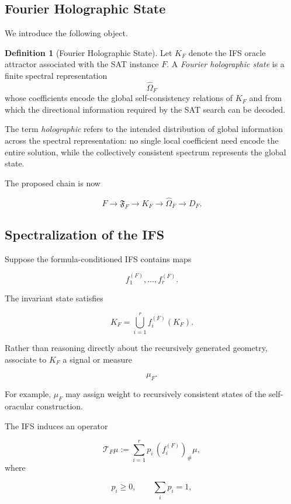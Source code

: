 \documentclass[11pt]{article}
\theoremstyle{plain}
\theoremstyle{definition}
\newtheorem{definition}[theorem]{Definition}
\begin{document}
\subsection{Fourier Holographic State}

We introduce the following object.

\begin{definition}[Fourier Holographic State]
\label{def:fourier-holographic-state}
Let \(K_F\) denote the IFS oracle attractor associated with the SAT instance
\(F\).  A \emph{Fourier holographic state} is a finite spectral
representation
\[
    \widehat{\Omega}_F
\]
whose coefficients encode the global self-consistency relations of \(K_F\)
and from which the directional information required by the SAT search can be
decoded.
\end{definition}

The term \emph{holographic} refers to the intended distribution of global
information across the spectral representation: no single local coefficient
need encode the entire solution, while the collectively consistent spectrum
represents the global state.

The proposed chain is now

\[
\boxed{
F
\longrightarrow
\mathfrak{F}_F
\longrightarrow
K_F
\longrightarrow
\widehat{\Omega}_F
\longrightarrow
D_F.
}
\]

\subsection{Spectralization of the IFS}

Suppose the formula-conditioned IFS contains maps

\[
    f_1^{(F)},\dots,f_r^{(F)}.
\]

The invariant state satisfies

\[
    K_F
    =
    \bigcup_{i=1}^{r}
    f_i^{(F)}(K_F).
\]

Rather than reasoning directly about the recursively generated geometry,
associate to \(K_F\) a signal or measure

\[
    \mu_F.
\]

For example, \(\mu_F\) may assign weight to recursively consistent states of
the self-oracular construction.

The IFS induces an operator

\[
    \mathcal{T}_F\mu
    :=
    \sum_{i=1}^{r}
    p_i\,(f_i^{(F)})_\#\mu,
\]
where

\[
    p_i\geq 0,
    \qquad
    \sum_i p_i=1,
\]
\end{document}
